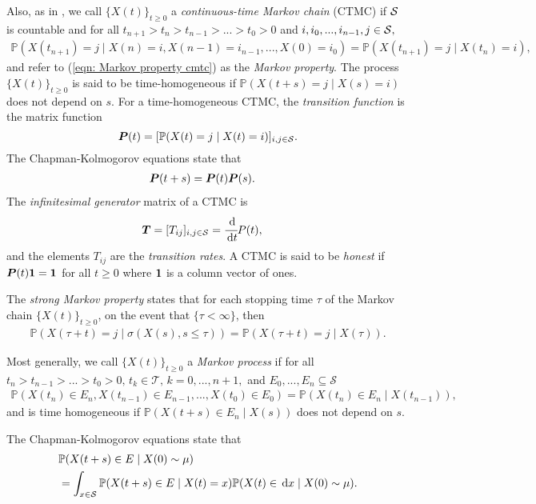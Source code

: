 Also, as in \cite[Section~1.3]{MEinAP}, we call \(\{X(t)\}_{t\geq 0}\) a \emph{continuous-time Markov chain} (CTMC) if \(\mathcal{S}\) is countable and for all \(t_{n+1} > t_n > t_{n-1} > ... > t_0 > 0\) and \(i,i_0,...,i_{n-1},j\in\mathcal{S},\)
\begin{align}\label{eqn: Markov property cmtc}
	\mathbb P(X(t_{n+1})=j \mid X(n)=i, X(n-1)=i_{n-1},...,X(0)=i_0) = \mathbb P(X(t_{n+1})=j \mid X(t_n)=i),
\end{align}
and refer to (\ref{eqn: Markov property cmtc}) as the \emph{Markov property}. The process \(\{X(t)\}_{t\geq 0}\) is said to be time-homogeneous if 
\(\mathbb P(X(t+s)=j \mid X(s)=i)\) does not depend on \(s\). For a time-homogeneous CTMC, the \emph{transition function} is the matrix function 
\[\boldsymbol P(t) = [\mathbb P(X(t)=j \mid X(t)=i)]_{i,j\in\mathcal{S}}.\]
The Chapman-Kolmogorov equations state that 
\begin{align} 
	&\nonumber \boldsymbol P(t+s)=\boldsymbol P(t)\boldsymbol P(s).
\end{align}
The \emph{infinitesimal generator} matrix of a CTMC is 
\begin{align} 
	&\nonumber \boldsymbol T = [T_{ij}]_{i,j\in\mathcal{S}} = \cfrac{\, \mathrm{d}}{\, \mathrm{d} t}P(t),
\end{align}
and the elements \(T_{ij}\) are the \emph{transition rates}. A CTMC is said to be \emph{honest} if \(\boldsymbol P(t)\boldsymbol 1=\boldsymbol 1\) for all \(t\geq 0\) where \(\boldsymbol 1\) is a column vector of ones. 

The \emph{strong Markov property} states that for each stopping time \(\tau\) of the Markov chain \(\{X(t)\}_{t\geq 0}\), on the event that \(\{\tau<\infty\}\), then 
\begin{align}\label{eqn: strong Markov property ctmc}
	\mathbb P(X(\tau + t)=j \mid \sigma(X(s),s\leq \tau)) = \mathbb P(X(\tau+t)=j \mid X(\tau)).
\end{align}

Most generally, we call \(\{X(t)\}_{t\geq 0}\) a \emph{Markov process} if for all \(t_n > t_{n-1} > ... > t_0 > 0,\, t_k\in\mathcal T,\, k=0,...,n+1,\) and \(E_0,...,E_n\subseteq \mathcal S\)
\begin{align}\label{eqn: Markov process}
	\mathbb P(X(t_n)\in E_n,X(t_{n-1})\in E_{n-1},...,X(t_0)\in E_0) 
	= \mathbb P(X(t_n)\in E_n\mid X(t_{n-1})),
\end{align}
and is time homogeneous if \(\mathbb P(X(t+s)\in E_n\mid X(s))\) does not depend on \(s\). 

The Chapman-Kolmogorov equations state that 
\begin{align}\label{eqn: CK}
	&\nonumber \mathbb P(X(t+s)\in E\mid X(0)\sim \mu) 
	\\&= \int_{x\in\mathcal{S}}\mathbb P(X(t+s)\in E\mid X(t)=x)\mathbb P(X(t)\in \, \mathrm{d} x\mid X(0)\sim \mu).
\end{align}

